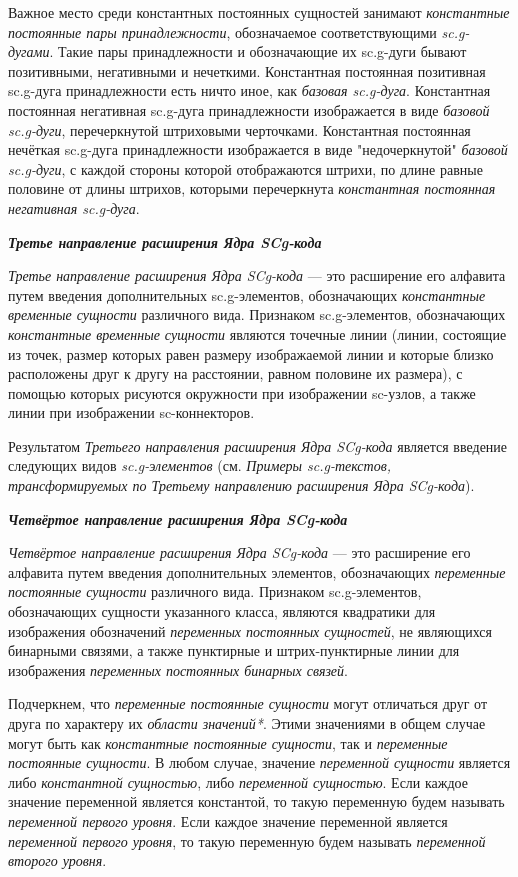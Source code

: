 Важное место среди константных постоянных сущностей занимают \textit{константные постоянные пары принадлежности}, обозначаемое соответствующими \textit{sc.g-дугами}. Такие пары принадлежности и обозначающие их sc.g-дуги бывают позитивными, негативными и нечеткими. Константная постоянная позитивная sc.g-дуга принадлежности есть ничто иное, как \textit{базовая sc.g-дуга}. Константная постоянная негативная sc.g-дуга принадлежности изображается в виде \textit{базовой sc.g-дуги}, перечеркнутой штриховыми черточками. Константная постоянная нечёткая sc.g-дуга принадлежности изображается в виде "недочеркнутой"{} \textit{базовой sc.g-дуги}, с каждой стороны которой отображаются штрихи, по длине равные половине от длины штрихов, которыми перечеркнута \textit{константная постоянная негативная sc.g-дуга}.

\textbf{\textit{Третье направление расширения Ядра SCg-кода}}

\textit{Третье направление расширения Ядра SCg-кода} --- это расширение его алфавита путем введения дополнительных sc.g-элементов, обозначающих \textit{константные временные сущности} различного вида. Признаком sc.g-элементов, обозначающих \textit{константные временные сущности} являются точечные линии (линии, состоящие из точек, размер которых равен размеру изображаемой линии и которые близко расположены друг к другу на расстоянии, равном половине их размера), с помощью которых рисуются окружности при изображении sc-узлов, а также линии при изображении sc-коннекторов.

Результатом \textit{Третьего направления расширения Ядра SCg-кода} является введение следующих видов \textit{sc.g-элементов} (см. \textit{Примеры sc.g-текстов, трансформируемых по Третьему направлению расширения Ядра SCg-кода}).

\textbf{\textit{Четвёртое направление расширения Ядра SCg-кода}}

\textit{Четвёртое направление расширения Ядра SCg-кода} --- это расширение его алфавита путем введения дополнительных элементов, обозначающих \textit{переменные постоянные сущности} различного вида. Признаком sc.g-элементов, обозначающих сущности указанного класса, являются квадратики для изображения обозначений \textit{переменных постоянных сущностей}, не являющихся бинарными связями, а также пунктирные и штрих-пунктирные линии для изображения \textit{переменных постоянных бинарных связей}. 

Подчеркнем, что \textit{переменные постоянные сущности} могут отличаться друг от друга по характеру их \textit{области значений*}. Этими значениями в общем случае могут быть как \textit{константные постоянные сущности}, так и \textit{переменные постоянные сущности}. В любом случае, значение \textit{переменной сущности} является либо \textit{константной сущностью}, либо \textit{переменной сущностью}. Если каждое значение переменной является константой, то такую переменную будем называть \textit{переменной первого уровня}. Если каждое значение переменной является \textit{переменной первого уровня}, то такую переменную будем называть \textit{переменной второго уровня}. 


